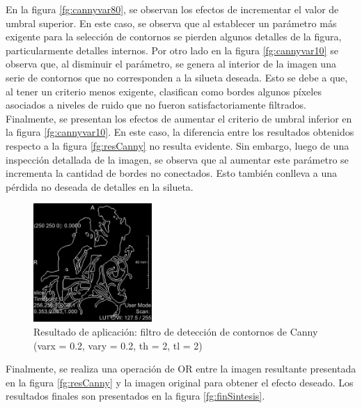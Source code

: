 \documentclass{article}
\begin{document}
En la figura \ref{fg:cannyvar80}, se observan los efectos de incrementar el valor de umbral superior. En este caso, se observa que al establecer un parámetro más exigente para la selección de contornos se pierden algunos detalles de la figura, particularmente detalles internos. Por otro lado en la figura \ref{fg:cannyvar10} se observa que, al disminuir el parámetro, se genera al interior de la imagen una serie de contornos que no corresponden a la silueta deseada. Esto se debe a que, al tener un criterio menos exigente, clasifican como bordes algunos píxeles asociados a niveles de ruido que no fueron satisfactoriamente filtrados. \\
Finalmente, se presentan los efectos de aumentar el criterio de umbral inferior en la figura \ref{fg:cannyvar10}. En este caso, la diferencia entre los resultados obtenidos respecto a la figura \ref{fg:resCanny} no resulta evidente. Sin embargo, luego de una inspección detallada de la imagen, se observa que al aumentar este parámetro se incrementa la cantidad de bordes no conectados. Esto también conlleva a una pérdida no deseada de detalles en la silueta.

\begin{figure}[ht]
\begin{center}
\includegraphics[width=0.4\textwidth]{4sintesis/cannyu2l2.png} %
\caption{Resultado de aplicación: filtro de detección de contornos de Canny (varx = 0.2, vary = 0.2, th = 2, tl = 2)}
\label{fg:cannyvar22}
\end{center}
\end{figure}
\FloatBarrier

Finalmente, se realiza una operación de OR entre la imagen resultante presentada en la figura \ref{fg:resCanny} y la imagen original para obtener el efecto deseado. Los resultados finales son presentados en la figura \ref{fg:finSintesis}.
\end{document}
